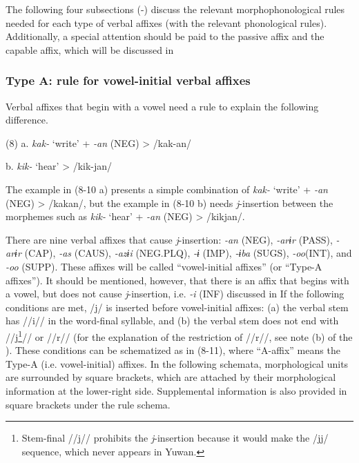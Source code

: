 The following four subsections (-) discuss the relevant morphophonological rules needed for each type of verbal affixes (with the relevant phonological rules). Additionally, a special attention should be paid to the passive affix and the capable affix, which will be discussed in 

\subsubsection{Type A: rule for vowel-initial verbal affixes}

Verbal affixes that begin with a vowel need a rule to explain the following difference.

(8)  a.  \textit{kak-}  ‘write’  +  \textit{{}-an} (NEG)  >  /kak-an/

  b.  \textit{kik-}  ‘hear’        >  /kik-jan/

The example in (8-10 a) presents a simple combination of \textit{kak-} ‘write’ + \textit{{}-an} (NEG) > /kakan/, but the example in (8-10 b) needs \textit{j}{}-insertion between the morphemes such as \textit{kik-} ‘hear’ + \textit{{}-an} (NEG) > /kikjan/.

There are nine verbal affixes that cause \textit{j}{}-insertion: \textit{{}-an} (NEG), \textit{{}-arɨr} (PASS), \textit{{}-arɨr} (CAP), \textit{{}-as} (CAUS), \textit{{}-azɨi} (NEG.PLQ), \textit{{}-ɨ} (IMP), \textit{{}-ɨba} (SUGS), \textit{{}-oo}(INT), and \textit{{}-oo} (SUPP). These affixes will be called “vowel-initial affixes” (or “Type-A affixes”). It should be mentioned, however, that there is an affix that begins with a vowel, but does not cause \textit{j}{}-insertion, i.e. \textit{{}-i} (INF) discussed in  If the following conditions are met, /j/ is inserted before vowel-initial affixes: (a) the verbal stem has //i// in the word-final syllable, and (b) the verbal stem does not end with //j\footnote{Stem-final //j// prohibits the \textit{j}{}-insertion because it would make the /jj/ sequence, which never appears in Yuwan.}// or //r// (for the explanation of the restriction of //r//, see note (b) of the ). These conditions can be schematized as in (8-11), where “A-affix” means the Type-A (i.e. vowel-initial) affixes. In the following schemata, morphological units are surrounded by square brackets, which are attached by their morphological information at the lower-right side. Supplemental information is also provided in square brackets under the rule schema.

